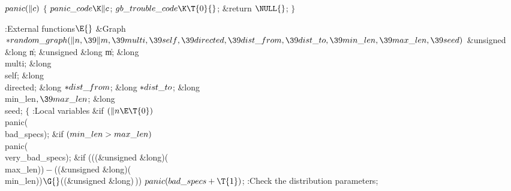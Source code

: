 \Y\B\4\D$\\{panic}(\|c)$ \5
${}\{{}$\5
\1${}\\{panic\_code}\K\|c{}$;\5
${}\\{gb\_trouble\_code}\K\T{0}{}$;\5
\&{return} ${}\NULL{}$;\5
${}\}{}$\2\par
\Y\B\4:External functions\X${}\E{}$\6
\1\1\&{Graph} ${}{*}\\{random\_graph}(\|n,\39\|m,\39\\{multi},\39\\{self},\39%
\\{directed},\39\\{dist\_from},\39\\{dist\_to},\39\\{min\_len},\39\\{max\_len},%
\39\\{seed}){}$\6
\&{unsigned} \&{long} \|n;\6
\&{unsigned} \&{long} \|m;\6
\&{long} \\{multi};\6
\&{long} \\{self};\6
\&{long} \\{directed};\6
\&{long} ${}{*}\\{dist\_from}{}$;\6
\&{long} ${}{*}\\{dist\_to}{}$;\6
\&{long} \\{min\_len}${},\39\\{max\_len}{}$;\6
\&{long} \\{seed};\2\2\6
${}\{{}$\5
\1:Local variables\X\7
\&{if} ${}(\|n\E\T{0}){}$\1\5
\\{panic}(\\{bad\_specs});\2\6
\&{if} ${}(\\{min\_len}>\\{max\_len}){}$\1\5
\\{panic}(\\{very\_bad\_specs});\2\6
\&{if} (((\&{unsigned} \&{long})(\\{max\_len}))${}-{}$((\&{unsigned} \&{long})(%
\\{min\_len}))${}\G{}$((\&{unsigned} \&{long})\,))\1\5
${}\\{panic}(\\{bad\_specs}+\T{1}){}$;\2\6
:Check the distribution parameters\X;\6
